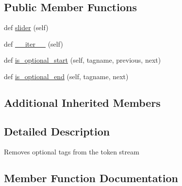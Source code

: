 \subsection*{Public Member Functions}
\begin{DoxyCompactItemize}
\item 
def \hyperlink{classpip_1_1__vendor_1_1html5lib_1_1filters_1_1optionaltags_1_1Filter_af2f7a359cdf7f13851b20b2ea85d0018}{slider} (self)
\item 
def \hyperlink{classpip_1_1__vendor_1_1html5lib_1_1filters_1_1optionaltags_1_1Filter_af8973ebccd0e269d2778bd44fdf4440c}{\+\_\+\+\_\+iter\+\_\+\+\_\+} (self)
\item 
def \hyperlink{classpip_1_1__vendor_1_1html5lib_1_1filters_1_1optionaltags_1_1Filter_a2253d85e9de72bc1389a04c48ae00106}{is\+\_\+optional\+\_\+start} (self, tagname, previous, next)
\item 
def \hyperlink{classpip_1_1__vendor_1_1html5lib_1_1filters_1_1optionaltags_1_1Filter_ad6f4a7b17951e591d96c15d7e12a8a9f}{is\+\_\+optional\+\_\+end} (self, tagname, next)
\end{DoxyCompactItemize}
\subsection*{Additional Inherited Members}


\subsection{Detailed Description}
\begin{DoxyVerb}Removes optional tags from the token stream\end{DoxyVerb}
 

\subsection{Member Function Documentation}
\mbox{\label{classpip_1_1__vendor_1_1html5lib_1_1filters_1_1optionaltags_1_1Filter_af8973ebccd0e269d2778bd44fdf4440c}} 
